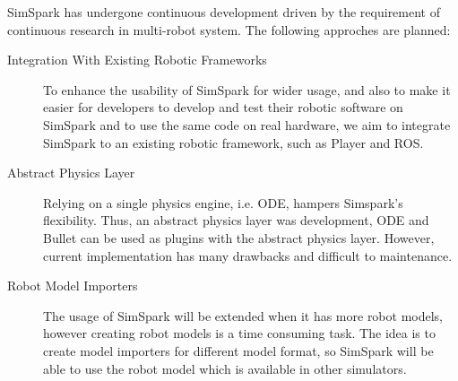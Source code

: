 \documentclass{llncs}
\begin{document}
SimSpark has undergone continuous development driven by the requirement of continuous research in multi-robot system. The following approches are planned:
\begin{description}
\item[Integration With Existing Robotic Frameworks] 
To enhance the usability of SimSpark for wider usage, and also to make it easier
for developers to develop and test their robotic software on SimSpark and to
use the same code on real hardware, we aim to integrate SimSpark to an 
existing robotic framework, such as Player and ROS.




\item[Abstract Physics Layer]
Relying on a single physics engine, i.e. ODE, hampers Simspark’s flexibility.
Thus, an abstract physics layer was development\cite{Held2010}, ODE and Bullet can be used as plugins with the abstract physics layer. However, current implementation has many drawbacks and difficult to maintenance.

\item[Robot Model Importers]
The usage of SimSpark will be extended when it has more robot models, however creating robot models is a time consuming task. The idea is to create model importers for different model format, so SimSpark will be able to use the robot model which is available in other simulators.
\end{description}
\end{document}
